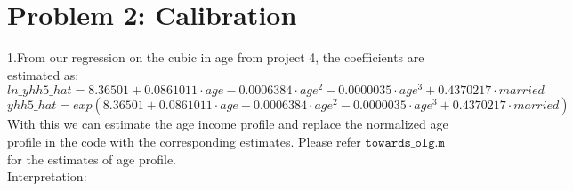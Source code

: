 \documentclass[12pt,a4paper]{article}
\begin{document}
\section*{Problem 2: Calibration}
1.From our regression on the cubic in age from project 4, the coefficients are estimated as:
\begin{equation*}
    ln\_yhh5\_hat=8.36501+0.0861011\cdot age-0.0006384 \cdot age^2-0.0000035\cdot age^3+0.4370217\cdot married   
\end{equation*}
\begin{equation*}
    yhh5\_hat=exp(8.36501+0.0861011\cdot age-0.0006384 \cdot age^2-0.0000035\cdot age^3+0.4370217\cdot married)  
\end{equation*}
With this we can estimate the age income profile and replace the normalized age profile in the code with the corresponding estimates. Please refer $\texttt{towards\_olg.m}$ for the estimates of age profile. \\
Interpretation:

\\
\end{document}
